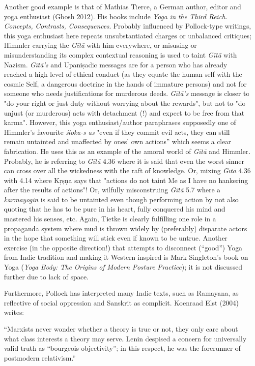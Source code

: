Another good example is that of Mathias Tierce, a German author, editor and yoga enthusiast (Ghosh 2012). His books include {\sl Yoga in the Third Reich. Concepts, Contrasts, Consequences}. Probably influenced by Pollock-type writings, this yoga enthusiast here repeats unsubstantiated charges or unbalanced critiques; Himmler carrying the {\sl Gītā} with him everywhere, or misusing or misunderstanding its complex contextual reasoning is used to taint {\sl Gītā} with Nazism. {\sl Gītā's} and Upaniṣadic messages are for a person who has already reached a high level of ethical conduct (as they equate the human self with the cosmic Self, a dangerous doctrine in the hands of immature persons) and not for someone who needs justifications for murderous deeds. {\sl Gītā's} message is closer to "do your right or just duty without worrying about the rewards", but not to "do unjust (or murderous) acts with detachment (!) and expect to be free from that karma". However, this yoga enthusiast/author paraphrases supposedly one of Himmler's favourite {\sl śloka-s as} "even if they commit evil acts, they can still remain untainted and unaffected by ones' own actions” which seems a clear fabrication. He uses this as an example of the amoral world of {\sl Gītā} and Himmler. Probably, he is referring to {\sl Gītā} 4.36 where it is said that even the worst sinner can cross over all the wickedness with the raft of knowledge. Or, mixing {\sl Gītā} 4.36 with 4.14 where Kṛṣṇa says that "actions do not taint Me as I have no hankering after the results of actions"! Or, wilfully misconstruing {\sl Gītā} 5.7 where a {\sl karmayogin} is said to be untainted even though performing action by not also quoting that he has to be pure in his heart, fully conquered his mind and mastered his senses, etc. Again, Tietke is clearly fulfilling one role in a propaganda system where mud is thrown widely by (preferably) disparate actors in the hope that something will stick even if known to be untrue. Another exercise (in the opposite direction!) that attempts to disconnect (“good”) Yoga from Indic tradition and making it Western-inspired is Mark Singleton’s book on Yoga ({\sl Yoga Body: The Origins of Modern Posture Practice}); it is not discussed further due to lack of space.

Furthermore, Pollock has interpreted many Indic texts, such as Ramayana, as reflective of social oppression and Sanskrit as complicit. Koenraad Elst (2004) writes: 
\smallskip

\begin{myquote}
“Marxists never wonder whether a theory is true or not, they only care about what class interests a theory may serve.  Lenin despised a concern for universally valid truth as “bourgeois objectivity”; in this respect, he was the forerunner of postmodern relativism.”
\end{myquote}
\smallskip

